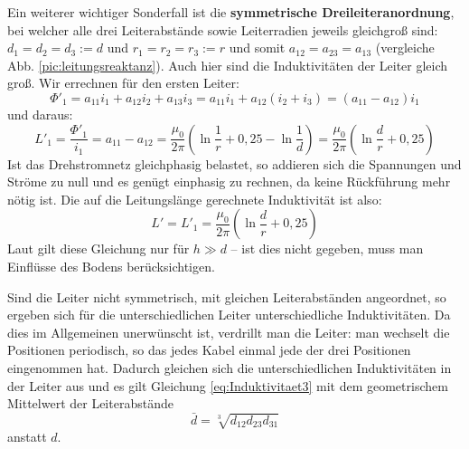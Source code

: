Ein weiterer wichtiger Sonderfall ist die \textbf{symmetrische Dreileiteranordnung}, bei welcher alle drei Leiterabstände sowie Leiterradien jeweils gleichgroß sind: $d_1=d_2=d_3:=d$ und $r_1=r_2=r_3:=r$ und somit $a_{12}=a_{23}=a_{13}$ (vergleiche Abb. \ref{pic:leitungsreaktanz}). Auch hier sind die Induktivitäten der Leiter gleich groß. Wir errechnen für den ersten Leiter:
\begin{equation}
\Phi'_1 = a_{11}i_1+a_{12}i_2+a_{13}i_3 = a_{11}i_1+a_{12}\left(i_2+i_3\right) = \left(a_{11}-a_{12}\right)i_1
\end{equation}
und daraus:
\begin{equation}
L'_1 = \frac{\Phi'_1}{i_1} = a_{11}-a_{12} = \frac{\mu_0}{2\pi}\left(\ln\frac{1}{r}+0,25-\ln\frac{1}{d} \right) =
\frac{\mu_0}{2\pi}\left(\ln\frac{d}{r}+0,25 \right)
\end{equation}
Ist das Drehstromnetz gleichphasig belastet, so addieren sich die Spannungen und Ströme zu null und es genügt einphasig zu rechnen, da keine Rückführung mehr nötig ist. Die auf die Leitungslänge gerechnete Induktivität ist also:
\begin{equation}\label{eq:Induktivitaet3}
L' = L'_1 = \frac{\mu_0}{2\pi}\left(\ln\frac{d}{r}+0,25 \right)
\end{equation}
Laut \cite{Harrison} gilt diese Gleichung nur für $h\gg d$ – ist dies nicht gegeben, muss man Einflüsse des Bodens berücksichtigen.

Sind die Leiter nicht symmetrisch, mit gleichen Leiterabständen angeordnet, so ergeben sich für die unterschiedlichen Leiter unterschiedliche Induktivitäten. Da dies im Allgemeinen unerwünscht ist, verdrillt man die Leiter: man wechselt die Positionen periodisch, so das jedes Kabel einmal jede der drei Positionen eingenommen hat. Dadurch gleichen sich die unterschiedlichen Induktivitäten in der Leiter aus und es gilt Gleichung \eqref{eq:Induktivitaet3} mit dem geometrischem Mittelwert der Leiterabstände
\begin{equation}
\bar{d} = \sqrt[3]{d_{12}d_{23}d_{31}}
\end{equation}
anstatt $d$.

